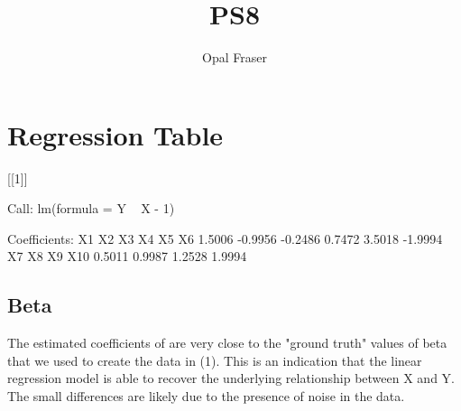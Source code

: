 \documentclass{article}
\title{PS8}
\author{Opal Fraser}
\begin{document}
\maketitle

\section{Regression Table}
[[1]]

Call:
lm(formula = Y ~ X - 1)

Coefficients:
     X1       X2       X3       X4       X5       X6  
 1.5006  -0.9956  -0.2486   0.7472   3.5018  -1.9994  
     X7       X8       X9      X10  
 0.5011   0.9987   1.2528   1.9994  

\subsection{Beta}

The estimated coefficients of are very close to the "ground truth" values of beta that we used to create the data in (1). This is an indication that the linear regression model is able to recover the underlying relationship between X and Y. The small differences are likely due to the presence of noise in the data. 
\end{document}

